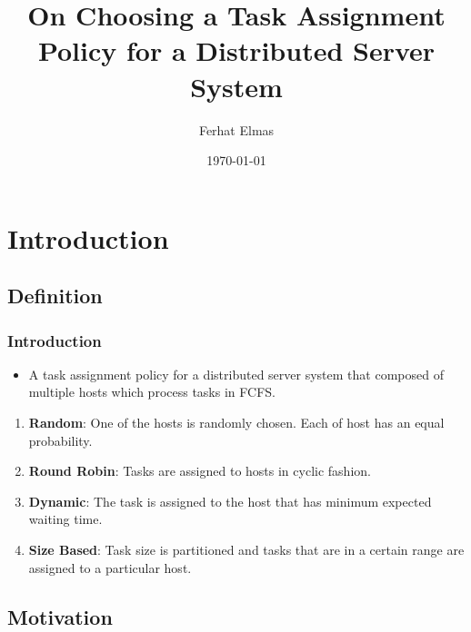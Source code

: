 \documentclass[red]{beamer}
\title{On Choosing a Task Assignment Policy for a Distributed Server System\cite{paper}}
\author{Ferhat Elmas}
\institute{Performance Evaluation Mini Project}
\date{\today}
\begin{document}
\begin{frame}
  \titlepage
\end{frame}

\section[Outline]{}

\begin{frame}
  \tableofcontents[hideallsubsections]
\end{frame}

\section{Introduction}

\subsection{Definition}
\begin{frame}
  \frametitle{Introduction}   

\begin{itemize}
\item A task assignment policy for a distributed server system that composed of multiple hosts which process tasks in FCFS.
\end{itemize}

  \begin{enumerate}
  \item<1-> \textbf{Random}: One of the hosts is randomly chosen. Each of host has an equal probability. 
  \item<2-> \textbf{Round Robin}: Tasks are assigned to hosts in cyclic fashion.
  \item<3-> \textbf{Dynamic}: The task is assigned to the host that has minimum expected waiting time.
  \item<4-> \textbf{Size Based}: Task size is partitioned and tasks that are in a certain range are assigned to a particular host.
  \end{enumerate}

\end{frame}

\subsection{Motivation}
\end{document}
